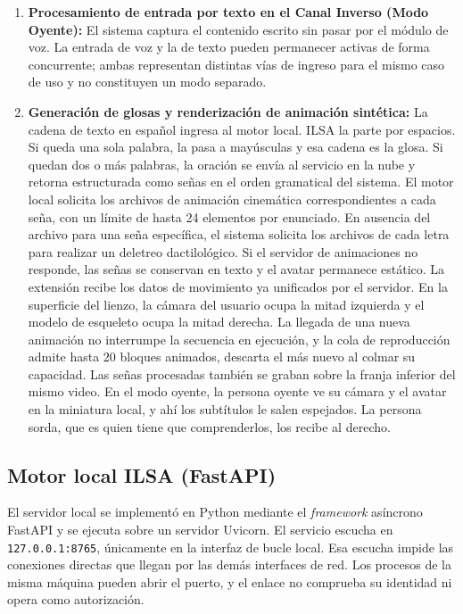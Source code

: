 \begin{enumerate}
\item \textbf{Procesamiento de entrada por texto en el Canal Inverso (Modo Oyente):} 
El sistema captura el contenido escrito sin pasar por el módulo de voz. La entrada de voz y la de texto pueden permanecer activas de forma concurrente; ambas representan distintas vías de ingreso para el mismo caso de uso y no constituyen un modo separado.

\item \textbf{Generación de glosas y renderización de animación sintética:} 
La cadena de texto en español ingresa al motor local. ILSA la parte por espacios. Si queda una sola palabra, la pasa a mayúsculas y esa cadena es la glosa. Si quedan dos o más palabras, la oración se envía al servicio en la nube y retorna estructurada como señas en el orden gramatical del sistema. El motor local solicita los archivos de animación cinemática correspondientes a cada seña, con un límite de hasta 24 elementos por enunciado. En ausencia del archivo para una seña específica, el sistema solicita los archivos de cada letra para realizar un deletreo dactilológico. Si el servidor de animaciones no responde, las señas se conservan en texto y el avatar permanece estático. La extensión recibe los datos de movimiento ya unificados por el servidor. En la superficie del lienzo, la cámara del usuario ocupa la mitad izquierda y el modelo de esqueleto ocupa la mitad derecha. La llegada de una nueva animación no interrumpe la secuencia en ejecución, y la cola de reproducción admite hasta 20 bloques animados, descarta el más nuevo al colmar su capacidad. Las señas procesadas también se graban sobre la franja inferior del mismo video. En el modo oyente, la persona oyente ve su cámara y el avatar en la miniatura local, y ahí los subtítulos le salen espejados. La persona sorda, que es quien tiene que comprenderlos, los recibe al derecho.
\end{enumerate}

\subsection{Motor local ILSA (FastAPI)}

El servidor local se implementó en Python mediante el \textit{framework} asíncrono FastAPI y se ejecuta sobre un servidor Uvicorn. El servicio escucha en \texttt{127.0.0.1:8765}, únicamente en la interfaz de bucle local. Esa escucha impide las conexiones directas que llegan por las demás interfaces de red. Los procesos de la misma máquina pueden abrir el puerto, y el enlace no comprueba su identidad ni opera como autorización.

